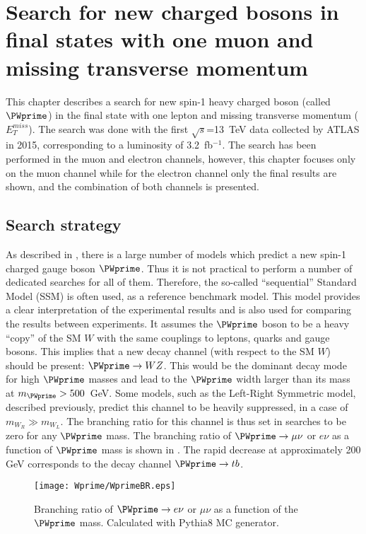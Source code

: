 \chapter{Search for new charged bosons in final states with one muon and missing transverse momentum}
\label{chap:Wprime}



This chapter describes a search for new spin-1 heavy charged boson (called $\PWprime$) in the final state with one lepton and missing transverse momentum ($E_T^{miss}$).
The search was done with the first $\sqrt{s}$=13~TeV data collected by ATLAS  in 2015, corresponding to a luminosity of 3.2~fb$^{-1}$. The search has been performed in the muon and electron channels, however, this chapter focuses only on the muon channel while for the electron channel only the final results are shown, and the combination of both channels is presented.



\section{Search strategy}
\label{sec:wprimeIntro} 

As described in , there is a large number of models
which predict a new spin-1 charged gauge boson $\PWprime$. Thus it is not practical to perform a number of dedicated searches for all of them. Therefore, the so-called ``sequential'' Standard Model (SSM) is often used, as a reference benchmark model.
This model provides a clear interpretation of the experimental results and
is also used for comparing the results between experiments.
It assumes the $\PWprime$ boson to be a heavy ``copy'' of the SM $W$ with the same couplings to leptons, quarks and gauge bosons. 
This implies that a new decay channel (with respect to the SM $W$)
should be present: $\PWprime \to WZ$. This would be the dominant decay mode 
for high $\PWprime$ masses and lead to the $\PWprime$ width larger
than its mass at  $m_{\PWprime} > 500$~GeV. 
Some models, such as the Left-Right Symmetric model, described previously, predict this channel to be heavily suppressed, in a case of $m_{W_R} \gg m_{W_L}$.
The branching ratio for this channel is thus set in searches to be zero for any $\PWprime$ mass.
The branching ratio of $\PWprime \to \mu\nu$ or $e\nu$ as a function of $\PWprime$ mass
is shown in . The rapid decrease at approximately 200 GeV corresponds to the decay channel $\PWprime \to tb$.
\begin{figure}[!htb]
  \centering
  \texttt{[image: Wprime/WprimeBR.eps]}
  \caption{Branching ratio of $\PWprime \rightarrow e\nu$ or $\mu\nu$ as a function of the $\PWprime$ mass. Calculated with Pythia8 MC generator.}
  \label{fig:wprimeBR}
\end{figure}


